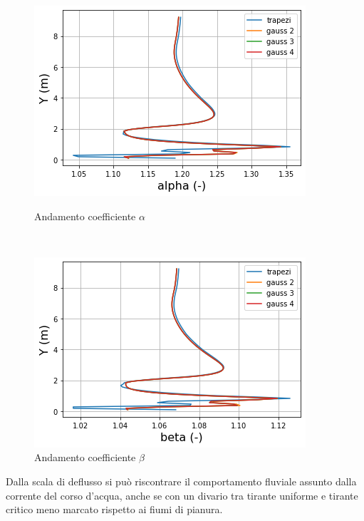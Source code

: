\documentclass[12pt]{article} %
\begin{document}
\begin{figure}[H]
\begin{minipage}[b]{8.5cm}
\centering
    \includegraphics[width=1 \textwidth]{alphava.png}
    \caption{Andamento coefficiente $\alpha$}
    \label{fig:Vara_alfa}
\end{minipage}
\ \hspace{2mm} \hspace{3mm} \
\begin{minipage}[b]{8.5cm}
    \centering
    \includegraphics[width=1 \textwidth]{betava.png}
    \caption{Andamento coefficiente $\beta$}
    \label{fig:Vara_beta}
\end{minipage}
\end{figure}

\noindent Dalla scala di deflusso si può riscontrare il comportamento fluviale assunto dalla corrente del corso d’acqua, anche se con un divario tra tirante uniforme e tirante critico meno marcato rispetto ai fiumi di pianura.
\end{document}
